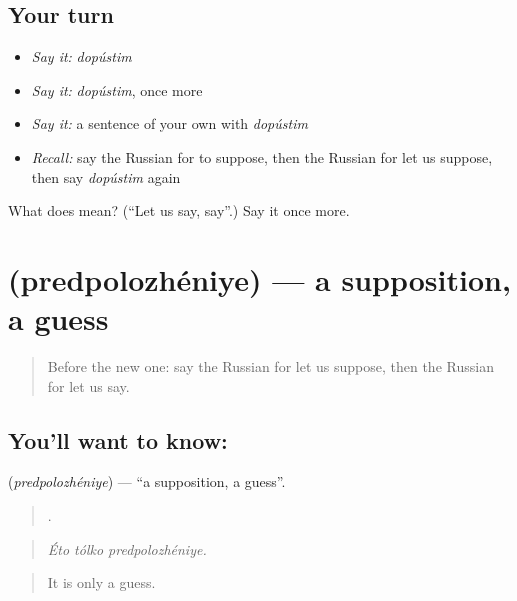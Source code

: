 \subsection*{Your turn}
\begin{itemize}
\raggedright
  \item \emph{Say it:} \emph{dopústim}
  \item \emph{Say it:} \emph{dopústim}, once more
  \item \emph{Say it:} a sentence of your own with \emph{dopústim}
  \item \emph{Recall:} say the Russian for to suppose, then the Russian for let us suppose, then say \emph{dopústim} again
\end{itemize}

\begin{tcolorbox}[breakable,colback=teal!4,colframe=teal!35!black,title={Before you move on}]
What does  mean? (\textquotedblleft{}Let us say, say\textquotedblright{}.) Say it once more.
\end{tcolorbox}
\section[\texorpdfstring{\ru{предположение} (predpolozhéniye)}{предположение (predpolozhéniye)}]{ (predpolozhéniye) — a supposition, a guess}

\label{lesson:RU-C371-predpolozhenie}



\begin{quote}
Before the new one: say the Russian for let us suppose, then the Russian for let us say.
\end{quote}

\subsection*{You'll want to know: }
\textbf{} (\emph{predpolozhéniye}) — \textquotedblleft{}a supposition, a guess\textquotedblright{}.

\begin{quote}
  .
\end{quote}

\begin{quote}
\emph{Éto tólko predpolozhéniye.}
\end{quote}

\begin{quote}
It is only a guess.
\end{quote}

